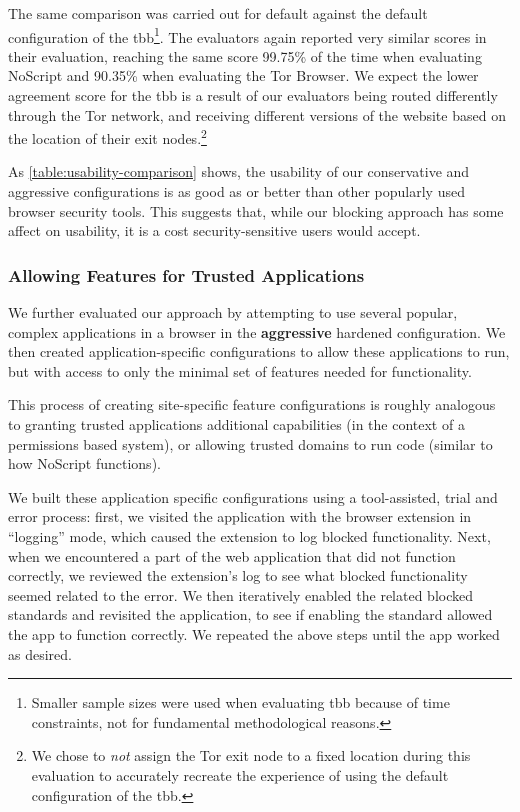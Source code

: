 The same comparison was carried out for default \FF against
the default configuration of the \gls{tbb}\footnote{Smaller sample sizes were
used when evaluating \gls{tbb} because of time constraints, not for fundamental
methodological reasons.}.  The evaluators again reported very similar scores in
their evaluation, reaching the same score 99.75\% of the time when evaluating
NoScript and 90.35\% when evaluating the Tor Browser.  We expect the lower
agreement score for the \gls{tbb} is a result of our evaluators being routed
differently through the Tor network, and receiving different versions of the
website based on the location of their exit nodes.\footnote{We chose to
\emph{not} assign the Tor exit node to a fixed location during this evaluation
to accurately recreate the experience of using the default configuration of the
\gls{tbb}.}

As \ref{table:usability-comparison} shows, the usability of our conservative
and aggressive configurations is as good as or better than other popularly used
browser security tools.  This suggests that, while our \WASs blocking
approach has some affect on usability, it is a cost security-sensitive users
would accept.


\subsubsection{Allowing Features for Trusted Applications}
We further evaluated our approach by attempting to use several popular,
complex \JS applications in a browser in the \textbf{aggressive} hardened
configuration.  We then created application-specific configurations to allow
these applications to run, but with access to only the minimal set of
features needed for functionality.

This process of creating site-specific feature configurations
is roughly analogous to granting trusted applications additional
capabilities (in the context of a permissions based system), or allowing trusted
domains to run \JS code (similar to how NoScript functions).

We built these application specific configurations using a tool-assisted, trial
and error process: first, we visited the application with the browser extension
in ``logging'' mode, which caused the extension to log blocked functionality.
Next, when we encountered a part of the web application that did not function
correctly, we reviewed the extension's log to see what blocked functionality
seemed related to the error.  We then iteratively enabled the related blocked
standards and revisited the application, to see if enabling the standard
allowed the app to function correctly.  We repeated the above steps until the
app worked as desired.

